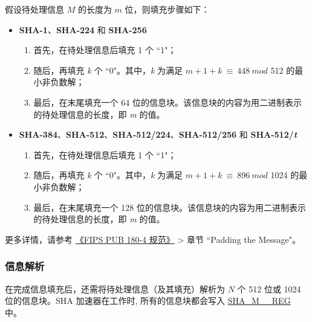 \documentclass[main\_\_CN.tex]{subfiles}
\begin{document}
假设待处理信息 \begin{math} M \end{math} 的长度为 \begin{math} m \end{math} 位，则填充步骤如下：

\begin{itemize}
    \item \textbf{SHA-1}、\textbf{SHA-224} 和 \textbf{SHA-256}
    \begin{enumerate}
        \item 首先，在待处理信息后填充 1 个 ``1"；
        \item 随后，再填充 {\it{k}} 个 ``0"。其中，{\it{k}} 为满足 \begin{math}m + 1 + k \ {\equiv} \ 448 \ mod \end{math} 512 的最小非负数解；
        \item 最后，在末尾填充一个 64 位的信息块。该信息块的内容为用二进制表示的待处理信息的长度，即 {\it{m}} 的值。
    \end{enumerate}
    \item \textbf{SHA-384}、\textbf{SHA-512}、\textbf{SHA-512/224}、\textbf{SHA-512/256} 和 \textbf{SHA-512/{\it{t}}}
    \begin{enumerate}
        \item 首先，在待处理信息后填充 1 个 ``1"；
        \item 随后，再填充 {\it{k}} 个 ``0"。其中，{\it{k}} 为满足 \begin{math}m + 1 + k \ {\equiv} \ 896 \ mod \end{math} 1024 的最小非负数解；
        \item 最后，在末尾填充一个 128 位的信息块。该信息块的内容为用二进制表示的待处理信息的长度，即 {\it{m}} 的值。
    \end{enumerate}
\end{itemize}

更多详情，请参考 \href{https://doi.org/10.6028/NIST.FIPS.180-4}{《FIPS PUB 180-4 规范》} > 章节 ``Padding the Message"。

\subsubsection{信息解析}\label{sec:sha-parsing-message}

在完成信息填充后，还需将待处理信息（及其填充）解析为 \begin{math}N\end{math} 个 512 位或 1024 位的信息块。SHA 加速器在工作时, 所有的信息块都会写入 \hyperref[regdesc:SHAMNREG]{SHA\_M\_\_REG} 中。
\end{document}
